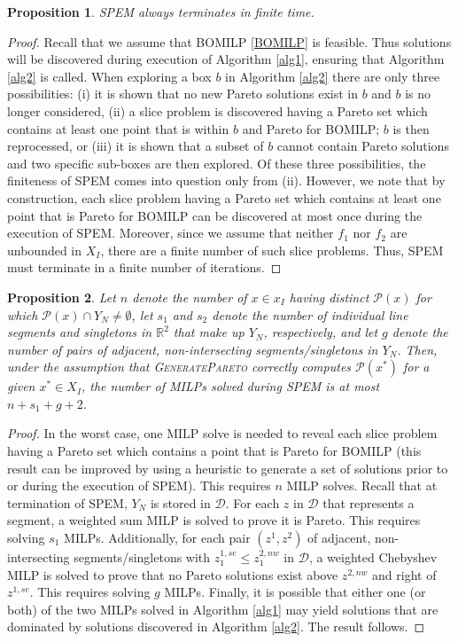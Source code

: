 \documentclass[12pt]{article}
\newtheorem{prop}{Proposition}
\newcommand{\R}{\mathbb{R}}
\begin{document}
\begin{prop}\label{prop4}
SPEM always terminates in finite time.
\end{prop}

\begin{proof}
Recall that we assume that BOMILP \eqref{BOMILP} is feasible. Thus solutions will be discovered during execution of Algorithm \ref{alg1}, ensuring that Algorithm \ref{alg2} is called. When exploring a box $b$ in Algorithm \ref{alg2} there are only three possibilities: (i) it is shown that no new Pareto solutions exist in $b$ and $b$ is no longer considered, (ii) a slice problem is discovered having a Pareto set which contains at least one point that is within $b$ and Pareto for BOMILP; $b$ is then reprocessed, or (iii) it is shown that a subset of $b$ cannot contain Pareto solutions and two specific sub-boxes are then explored. Of these three possibilities, the finiteness of SPEM comes into question only from (ii). However, we note that by construction, each slice problem having a Pareto set which contains at least one point that is Pareto for BOMILP can be discovered at most once during the execution of SPEM. Moreover, since we assume that neither $f_1$ nor $f_2$ are unbounded in $X_I$, there are a finite number of such slice problems. Thus, SPEM must terminate in a finite number of iterations.
\end{proof}

\begin{prop}\label{prop5}
Let $n$ denote the number of $x \in x_I$ having distinct $\mathcal{P}(x)$ for which $\mathcal{P}(x) \cap Y_N \neq \emptyset$, let $s_1$ and $s_2$ denote the number of individual line segments and singletons in $\R^2$ that make up $Y_N$, respectively, and let $g$ denote the number of pairs of adjacent, non-intersecting segments/singletons in $Y_N$. Then, under the assumption that \textsc{GeneratePareto} correctly computes $\mathcal{P}(x^*)$ for a given $x^* \in X_I$, the number of MILPs solved during SPEM is at most $n+s_1+g+2$.
\end{prop}

\begin{proof}
In the worst case, one MILP solve is needed to reveal each slice problem having a Pareto set which contains a point that is Pareto for BOMILP (this result can be improved by using a heuristic to generate a set of solutions prior to or during the execution of SPEM). This requires $n$ MILP solves. Recall that at termination of SPEM, $Y_N$ is stored in $\mathscr{D}$. For each $z$ in $\mathscr{D}$ that represents a segment, a weighted sum MILP is solved to prove it is Pareto. This requires solving $s_1$ MILPs. Additionally, for each pair $(z^1,z^2)$ of adjacent, non-intersecting segments/singletons with $z^{1,se}_1 \leq z^{2,nw}_1$ in $\mathscr{D}$, a weighted Chebyshev MILP is solved to prove that no Pareto solutions exist above $z^{2,nw}$ and right of $z^{1,se}$. This requires solving $g$ MILPs. Finally, it is possible that either one (or both) of the two MILPs solved in Algorithm \ref{alg1} may yield solutions that are dominated by solutions discovered in Algorithm \ref{alg2}. The result follows.
\end{proof}
\end{document}
